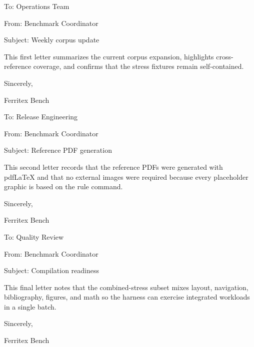 \documentclass{letter}
\newcommand{\letterblock}[4]{
To: #1

From: #2

Subject: #3

#4

Sincerely,

Ferritex Bench
}
\begin{document}
\letterblock
  {Operations Team}
  {Benchmark Coordinator}
  {Weekly corpus update}
  {This first letter summarizes the current corpus expansion, highlights cross-reference coverage, and confirms that the stress fixtures remain self-contained.}

\newpage

\letterblock
  {Release Engineering}
  {Benchmark Coordinator}
  {Reference PDF generation}
  {This second letter records that the reference PDFs were generated with pdfLaTeX and that no external images were required because every placeholder graphic is based on the rule command.}

\newpage

\letterblock
  {Quality Review}
  {Benchmark Coordinator}
  {Compilation readiness}
  {This final letter notes that the combined-stress subset mixes layout, navigation, bibliography, figures, and math so the harness can exercise integrated workloads in a single batch.}
\end{document}
